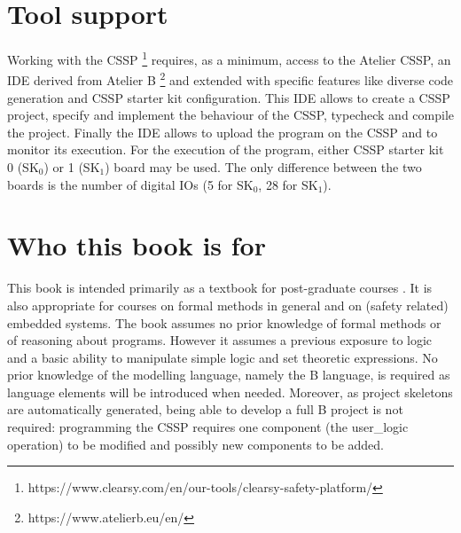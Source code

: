 \section{Tool support}
Working with the CSSP \footnote{https://www.clearsy.com/en/our-tools/clearsy-safety-platform/} requires, as a minimum, access to the Atelier CSSP, an IDE derived from Atelier B \footnote{https://www.atelierb.eu/en/} and extended with specific features like diverse code generation and CSSP starter kit configuration. This IDE allows to create a CSSP project, specify and implement the behaviour of the CSSP, typecheck and compile the project. Finally the IDE allows to upload the program on the CSSP and to monitor its execution. For the execution of the program, either CSSP starter kit 0 (SK$_0$) or 1 (SK$_1$) board may be used. The only difference between the two boards is the number of digital IOs (5 for SK$_0$, 28 for SK$_1$). 


\section{Who this book is for}
This book is intended primarily as a textbook for post-graduate courses . It is also appropriate for courses on formal methods in general and on (safety related) embedded systems. The book assumes no prior knowledge of formal methods or of reasoning about programs. However it assumes a previous exposure to logic and a basic ability to manipulate simple logic and set theoretic expressions. No prior knowledge of the modelling language, namely the B language, is required as language elements will be introduced when needed. Moreover, as project skeletons are automatically generated, being able to develop a full B project is not required: programming the CSSP requires one component (the user\_logic operation) to be modified and possibly new components to be added. 

